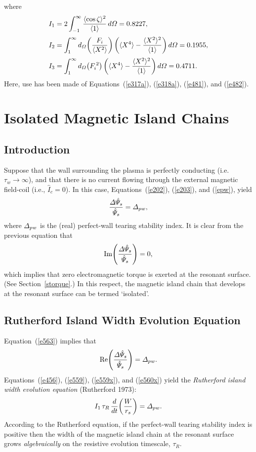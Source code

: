 \documentclass[notitlepage,12pt]{article}
\begin{document}
where
\begin{align}
I_1 &= 2\int_{-1}^\infty \frac{\langle \cos\zeta\rangle^2}{\langle 1\rangle}\,d{\mit\Omega} =0.8227,\\[0.5ex]
I_2&= \int_1^\infty d_{\mit\Omega}\!\left(\frac{F_i}{\langle X^2\rangle}\right)\left(\langle X^4\rangle - \frac{\langle X^2\rangle^2}{\langle 1\rangle}\right)d{\mit\Omega} =0.1955,\\[0.5ex]
I_3&= \int_1^\infty d_{\mit\Omega}\!\left(F_i^{\,2}\right)\left(\langle X^4\rangle - \frac{\langle X^2\rangle^2}{\langle 1\rangle}\right)d{\mit\Omega} =0.4711.
\end{align}
Here, use has been made of Equations~(\ref{e317a}), (\ref{e318a}), (\ref{e481}), and (\ref{e482}). 

\section{Isolated Magnetic Island Chains}
\subsection{Introduction}
Suppose that the wall surrounding the plasma is perfectly conducting (i.e.\, $\tau_w\rightarrow\infty$), and that there is no current
flowing through the external magnetic field-coil (i.e., $\hat{I}_c=0$). In this case, Equations~(\ref{e202}), 
(\ref{e203}), and (\ref{epw}),  yield 
\begin{equation}\label{e563}
\frac{{\mit\Delta}\hat{\mit\Psi}_s}{\hat{\mit\Psi}_s} ={\mit\Delta}_{pw},
\end{equation}
where ${\mit\Delta}_{pw}$ is the (real) perfect-wall tearing stability index. It is clear from the previous equation that
\begin{equation}\label{e559x}
{\rm Im}\!\left(\frac{{\mit\Delta}\hat{\mit\Psi}_s}{\hat{\mit\Psi}_s}\right) = 0,
\end{equation}
which implies that zero electromagnetic torque is exerted at the resonant surface. (See Section~\ref{storque}.) In this respect, the magnetic island chain that develops at the resonant surface can be termed `isolated'. 

\subsection{Rutherford Island Width Evolution Equation}
Equation~(\ref{e563}) implies that 
\begin{equation}\label{e560x}
{\rm Re}\!\left(\frac{{\mit\Delta}\hat{\mit\Psi}_s}{\hat{\mit\Psi}_s}\right) = {\mit\Delta}_{pw}.
\end{equation}
Equations~(\ref{e456}), (\ref{e559}), (\ref{e559x}), and (\ref{e560x}) yield the {\em Rutherford island width evolution equation}\/ (Rutherford 1973):
\begin{equation}\label{e561}
I_1\,\tau_R\,\frac{d}{dt}\!\left(\frac{W}{r_s}\right)= {\mit\Delta}_{pw}.
\end{equation}
 According to the Rutherford equation, if the perfect-wall tearing stability index is positive then the width of the magnetic
island chain at the resonant surface grows {\em algebraically}\/ on the resistive evolution timescale, $\tau_R$. 
\end{document}
